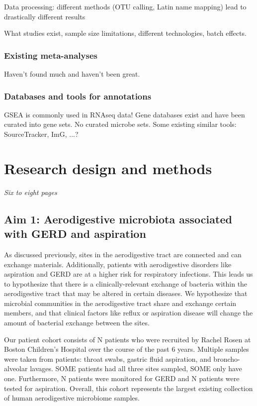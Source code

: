 \documentclass[12pt]{article}
\begin{document}
Data processing: different methods (OTU calling, Latin name mapping) lead to drastically different results

What studies exist, sample size limitations, different technologies, batch effects.

\subsubsection{Existing meta-analyses}
Haven't found much and haven't been great.

\subsubsection{Databases and tools for annotations}
GSEA is commonly used in RNAseq data! Gene databases exist and have been curated into gene sets.
No curated microbe sets. Some existing similar tools: SourceTracker, ImG, ...?

\section{Research design and methods}
\textit{Six to eight pages}

\subsection{Aim 1: Aerodigestive microbiota associated with GERD and aspiration}

As discussed previously, sites in the aerodigestive tract are connected and can exchange materials. Additionally, patients with aerodigestive disorders like aspiration and GERD are at a higher risk for respiratory infections. This leads us to hypothesize that there is a clinically-relevant exchange of bacteria within the aerodigestive tract that may be altered in certain diseases. We hypothesize that microbial communities in the aerodigestive tract share and exchange certain members, and that clinical factors like reflux or aspiration disease will change the amount of bacterial exchange between the sites.

Our patient cohort consists of N patients who were recruited by Rachel Rosen at Boston Children's Hospital over the course of the past 6 years. Multiple samples were taken from patients: throat swabs, gastric fluid aspiration, and broncho-alveolar lavages. SOME patients had all three sites sampled, SOME only have one. Furthermore, N patients were monitored for GERD and N patients were tested for aspiration. Overall, this cohort represents the largest existing collection of human aerodigestive microbiome samples.
\end{document}

